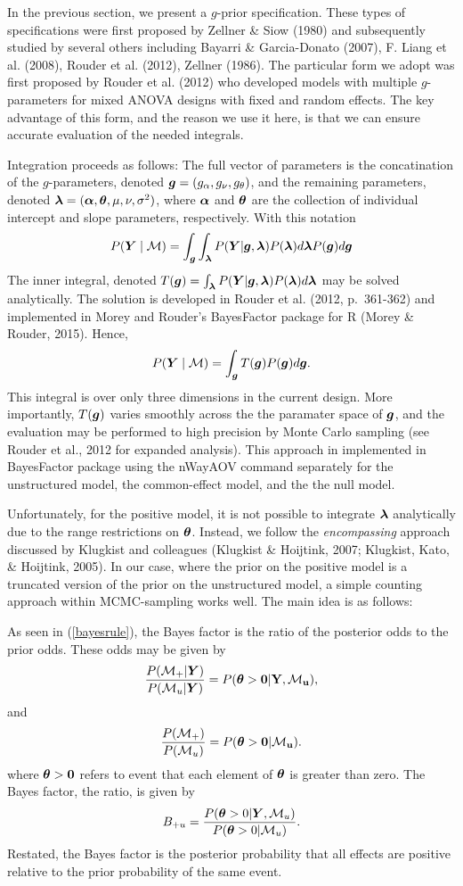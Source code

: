 \documentclass[american,man]{apa6}
\begin{document}
In the previous section, we present a \(g\)-prior specification. These
types of specifications were first proposed by Zellner \& Siow (1980)
and subsequently studied by several others including Bayarri \&
Garcia-Donato (2007), F. Liang et al. (2008), Rouder et al. (2012),
Zellner (1986). The particular form we adopt was first proposed by
Rouder et al. (2012) who developed models with multiple \(g\)-parameters
for mixed ANOVA designs with fixed and random effects. The key advantage
of this form, and the reason we use it here, is that we can ensure
accurate evaluation of the needed integrals.

Integration proceeds as follows: The full vector of parameters is the
concatination of the \(g\)-parameters, denoted
\(\bm g=(g_{\alpha}, g_\nu, g_\theta)\), and the remaining parameters,
denoted \(\bm \lambda=(\bm \alpha, \bm \theta, \mu, \nu, \sigma^2)\), where
\(\bm \alpha\) and \(\bm \theta\) are the collection of individual intercept
and slope parameters, respectively. With this notation \[
P(\bm Y \mid {\cal M}) = \int_{\bm g} \int_{\bm \lambda} P(\bm Y|\bm g,\bm \lambda) P(\bm \lambda) d\bm \lambda P(\bm g) d\bm g 
\] The inner integral, denoted
\(T(\bm g) = \int_{\bm \lambda} P(\bm Y | \bm g,\bm \lambda) P(\bm \lambda) d\bm \lambda\)
may be solved analytically. The solution is developed in Rouder et al.
(2012, p.~361-362) and implemented in Morey and Rouder's BayesFactor
package for R (Morey \& Rouder, 2015). Hence, \[
P(\bm Y \mid {\cal M}) = \int_{\bm g} T(\bm g) P(\bm g)d\bm g.
\] This integral is over only three dimensions in the current design.
More importantly, \(T(\bm g)\) varies smoothly across the the paramater
space of \(\bm g\), and the evaluation may be performed to high precision
by Monte Carlo sampling (see Rouder et al., 2012 for expanded analysis).
This approach in implemented in BayesFactor package using the nWayAOV
command separately for the unstructured model, the common-effect model,
and the the null model.

Unfortunately, for the positive model, it is not possible to integrate
\(\bm \lambda\) analytically due to the range restrictions on
\(\bm \theta\). Instead, we follow the \emph{encompassing} approach
discussed by Klugkist and colleagues (Klugkist \& Hoijtink, 2007;
Klugkist, Kato, \& Hoijtink, 2005). In our case, where the prior on the
positive model is a truncated version of the prior on the unstructured
model, a simple counting approach within MCMC-sampling works well. The
main idea is as follows:

As seen in (\ref{bayesrule}), the Bayes factor is the ratio of the
posterior odds to the prior odds. These odds may be given by \[
\frac{P({\cal M}_+|\bm Y)}{P({\cal M}_u|\bm Y)} = P(\bm \theta>\bf0|\bm Y,{\cal M}_u),
\] and \[
\frac{P({\cal M}_+)}{P({\cal M}_u)} = P(\bm \theta>\bf0|{\cal M}_u).
\] where \(\bm \theta>\bf0\) refers to event that each element of
\(\bm \theta\) is greater than zero. The Bayes factor, the ratio, is given
by \[
B_{+u} = \frac{P(\bm \theta>0|\bm Y,{\cal M}_u)}{P(\bm \theta>0|{\cal M}_u)}.
\] Restated, the Bayes factor is the posterior probability that all
effects are positive relative to the prior probability of the same
event.
\end{document}
